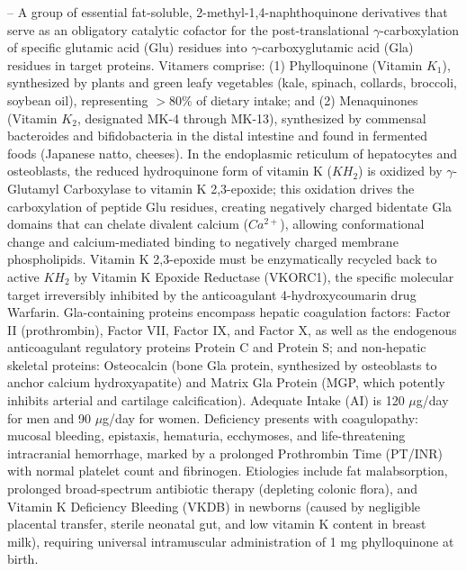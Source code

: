 -- A group of essential fat-soluble, 2-methyl-1,4-naphthoquinone derivatives that serve as an obligatory catalytic cofactor for the post-translational $\gamma$-carboxylation of specific glutamic acid (Glu) residues into $\gamma$-carboxyglutamic acid (Gla) residues in target proteins. Vitamers comprise: (1) Phylloquinone (Vitamin $K_1$), synthesized by plants and green leafy vegetables (kale, spinach, collards, broccoli, soybean oil), representing $>80\%$ of dietary intake; and (2) Menaquinones (Vitamin $K_2$, designated MK-4 through MK-13), synthesized by commensal bacteroides and bifidobacteria in the distal intestine and found in fermented foods (Japanese natto, cheeses). In the endoplasmic reticulum of hepatocytes and osteoblasts, the reduced hydroquinone form of vitamin K ($KH_2$) is oxidized by $\gamma$-Glutamyl Carboxylase to vitamin K 2,3-epoxide; this oxidation drives the carboxylation of peptide Glu residues, creating negatively charged bidentate Gla domains that can chelate divalent calcium ($Ca^{2+}$), allowing conformational change and calcium-mediated binding to negatively charged membrane phospholipids. Vitamin K 2,3-epoxide must be enzymatically recycled back to active $KH_2$ by Vitamin K Epoxide Reductase (VKORC1), the specific molecular target irreversibly inhibited by the anticoagulant 4-hydroxycoumarin drug Warfarin. Gla-containing proteins encompass hepatic coagulation factors: Factor II (prothrombin), Factor VII, Factor IX, and Factor X, as well as the endogenous anticoagulant regulatory proteins Protein C and Protein S; and non-hepatic skeletal proteins: Osteocalcin (bone Gla protein, synthesized by osteoblasts to anchor calcium hydroxyapatite) and Matrix Gla Protein (MGP, which potently inhibits arterial and cartilage calcification). Adequate Intake (AI) is 120 $\mu$g/day for men and 90 $\mu$g/day for women. Deficiency presents with coagulopathy: mucosal bleeding, epistaxis, hematuria, ecchymoses, and life-threatening intracranial hemorrhage, marked by a prolonged Prothrombin Time (PT/INR) with normal platelet count and fibrinogen. Etiologies include fat malabsorption, prolonged broad-spectrum antibiotic therapy (depleting colonic flora), and Vitamin K Deficiency Bleeding (VKDB) in newborns (caused by negligible placental transfer, sterile neonatal gut, and low vitamin K content in breast milk), requiring universal intramuscular administration of 1 mg phylloquinone at birth.

